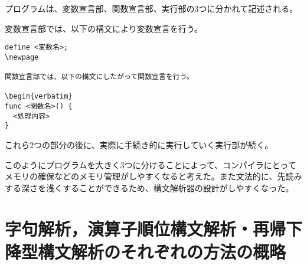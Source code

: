 \documentclass[11pt,a4j]{jarticle}
\begin{document}
プログラムは、変数宣言部、関数宣言部、実行部の3つに分かれて記述される。

変数宣言部では、以下の構文により変数宣言を行う。

\begin{verbatim}
define <変数名>;
\newpage

関数宣言部では、以下の構文にしたがって関数宣言を行う。

\begin{verbatim}
func <関数名>() {
  <処理内容>
}
\end{verbatim}


これら2つの部分の後に、実際に手続き的に実行していく実行部が続く。

このようにプログラムを大きく3つに分けることによって、コンパイラにとってメモリの確保などのメモリ管理がしやすくなると考えた。また文法的に、先読みする深さを浅くすることができるため、構文解析器の設計がしやすくなった。




\section{字句解析，演算子順位構文解析・再帰下降型構文解析のそれぞれの方法の概略}
\end{document}
